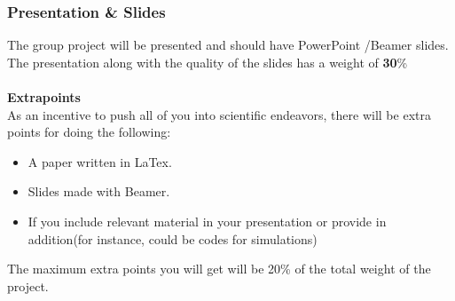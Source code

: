 \documentclass[9pt,addpoints]{exam}
\begin{document}
	\subsubsection*{Presentation \& Slides}
	The group project will be presented and should have PowerPoint /Beamer slides. The presentation along with the quality of the slides has a weight of \textbf{30}\% \\ \\
	\textbf{Extrapoints}\\
	As an incentive to push all of you into scientific endeavors, there will be extra points for doing the following:
	\begin{itemize}
		\item A paper written in LaTex.
		\item Slides made with Beamer.
		\item If you include relevant material in your presentation or provide in addition(for instance, could be codes for simulations)
	\end{itemize}
	The maximum extra points you will get will be 20\% of the total weight of the project.
\end{document}
